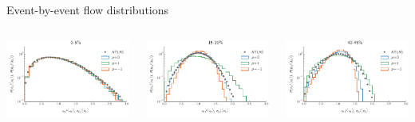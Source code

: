 \documentclass[svgnames]{beamer}
\begin{document}
\begin{frame}[t]{Event-by-event flow distributions}
\begin{columns}
\begin{column}{0.33\textwidth}
  \end{column}
 \end{columns}
 \vspace{0.1 in}
  \begin{columns}
  \begin{column}{0.33\textwidth}
    \centering \includegraphics[width=\columnwidth]{ebe-flow/v2_02}
  \end{column}
  \begin{column}{0.33\textwidth}
    \centering \includegraphics[width=\columnwidth]{ebe-flow/v2_09}
  \end{column}
  \begin{column}{0.33\textwidth}
    \centering \includegraphics[width=\columnwidth]{ebe-flow/v2_14}

\end{column}
\end{columns}
\end{frame}
\end{document}
